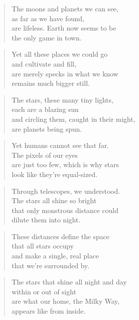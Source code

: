 \documentclass[10pt,a4paper]{article}
\begin{document}
\begin{paracol}{2}
\begin{verse}
The moons and planets we can see,\\
as far as we have found,\\
are lifeless. Earth now seems to be\\
the only game in town.
\end{verse}

\begin{verse}
Yet all these places we could go\\
and cultivate and fill,\\
are merely specks in what we know\\
remains much bigger still.
\end{verse}

\begin{verse}
The stars, these many tiny lights,\\
each are a blazing sun\\
and circling them, caught in their might,\\
are planets being spun.
\end{verse}

\begin{verse}
Yet humans cannot see that far.\\
The pixels of our eyes\\
are just too few, which is why stars\\
look like they’re equal-sized.
\end{verse}

\begin{verse}
Through telescopes, we understood.\\
The stars all shine so bright\\
that only monstrous distance could\\
dilute them into night.
\end{verse}

\begin{verse}
These distances define the space\\
that all stars occupy\\
and make a single, real place\\
that we’re surrounded by.
\end{verse}

\begin{verse}
The stars that shine all night and day\\
within or out of sight\\
are what our home, the Milky Way,\\
appears like from inside.
\end{verse}


\end{paracol}
\end{document}

